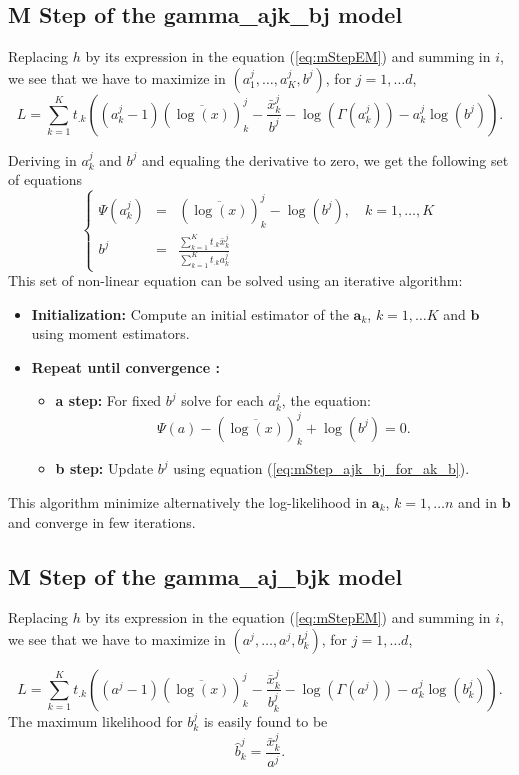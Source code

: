\documentclass[a4paper,10pt]{article}
\newcommand{\ba}{\mathbf{a}}
\newcommand{\bb}{\mathbf{b}}
\begin{document}
\subsection{M Step of the gamma\_ajk\_bj model}
Replacing $h$ by its expression in the equation (\ref{eq:mStepEM}) and summing in $i$, we see that we have to maximize in
$(a^j_1,\ldots, a^j_K, b^j)$, for $j=1,\ldots d$,
\begin{equation}\label{eq:mStep_ajk_bj}
L =\sum_{k=1}^{K} t_{.k} \left( (a^j_k-1)(\overline{\log(x)})^j_k - \frac{\bar{x}^j_k}{b^j} - \log(\Gamma(a^j_k)) - a^j_k \log(b^j) \right).
\end{equation}

Deriving in $a^j_k$ and $b^j$ and equaling the derivative to zero, we get the following set of equations
\begin{equation}\label{eq:mStep_ajk_bj_for_ak_b}
\left\lbrace
\begin{array}{lcl}
  \Psi(a^j_k) & = & (\overline{\log(x)})^j_k  - \log(b^j), \quad k=1,\ldots, K \\
  b^j         & = & \frac{\sum_{k=1}^K t_{.k} \bar{x}^j_k}{\sum_{k=1}^K t_{.k} a^j_k}
\end{array}
\right.
\end{equation}
This set of non-linear equation can be solved using an iterative algorithm:
\begin{itemize}
\item {\bf Initialization:} Compute an initial estimator of the $\ba_k$, $k=1,\ldots K$ and $\bb$
using moment estimators.
\item {\bf Repeat until convergence :}
\begin{itemize}
\item {\bf a step:} For fixed $b^j$ solve for each $a^j_k$, the equation:
\begin{equation*}
  \Psi(a) - (\overline{\log(x)})^j_k + \log(b^j) = 0.
\end{equation*}
\item {\bf b step:} Update $b^j$ using equation (\ref{eq:mStep_ajk_bj_for_ak_b}).
\end{itemize}
\end{itemize}

This algorithm minimize alternatively the log-likelihood in $\ba_k$, $k=1,\ldots n$ and in
$\bb$ and converge in few iterations.

\subsection{M Step of the gamma\_aj\_bjk model}
Replacing $h$ by its expression in the equation (\ref{eq:mStepEM}) and summing in $i$, we see that we have to maximize in
$(a^j,\ldots, a^j, b^j_k)$, for $j=1,\ldots d$,

\begin{equation}\label{eq:mStep_aj_bjk}
L =\sum_{k=1}^{K} t_{.k} \left( (a^j-1)(\overline{\log(x)})^j_k - \frac{\bar{x}^j_k}{b^j_k} - \log(\Gamma(a^j)) - a^j_k \log(b^j_k) \right).
\end{equation}
 The maximum likelihood for $b^j_k$ is
easily found to be
\begin{equation}\label{eq:mStep_aj_bjk_for_bjk}
\hat{b}^j_k = \frac{\bar{x}^j_k}{a^j}.
\end{equation}
\end{document}
